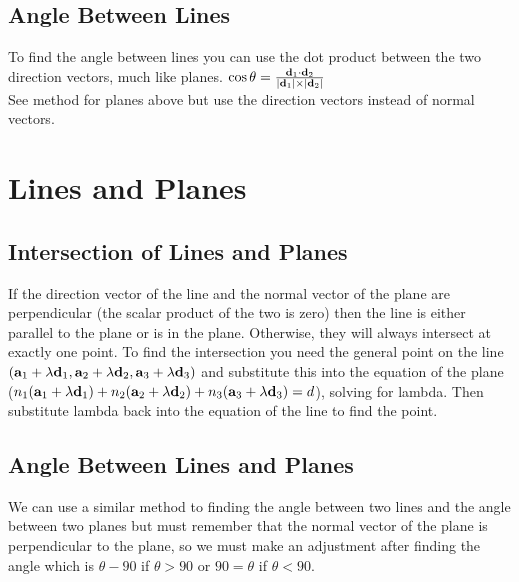 \documentclass[class=article, crop=false]{standalone}
\begin{document}
\subsection*{Angle Between Lines}
To find the angle between lines you can use the dot product between the two direction vectors, much like planes. $\cos \theta = \frac{\bold{d}_1 \cdot \bold{d}_2}{|\bold{d}_1| \times |\bold{d}_2|}$ \\

See method for planes above but use the direction vectors instead of normal vectors. 

\section*{Lines and Planes}
\subsection*{Intersection of Lines and Planes}
If the direction vector of the line and the normal vector of the plane are perpendicular (the scalar product of the two is zero) then the line is either parallel to the plane or is in the plane. Otherwise, they will always intersect at exactly one point. To find the intersection you need the general point on the line $(\bold{a}_1 + \lambda \bold{d}_1, \bold{a}_2 + \lambda \bold{d}_2, \bold{a}_3 + \lambda \bold{d}_3)$ and substitute this into the equation of the plane ($n_1(\bold{a}_1 + \lambda \bold{d}_1) + n_2(\bold{a}_2 + \lambda \bold{d}_2) + n_3(\bold{a}_3 + \lambda \bold{d}_3) = d$), solving for lambda. Then substitute lambda back into the equation of the line to find the point. 

\subsection*{Angle Between Lines and Planes}
We can use a similar method to finding the angle between two lines and the angle between two planes but must remember that the normal vector of the plane is perpendicular to the plane, so we must make an adjustment after finding the angle which is $\theta - 90$ if $\theta > 90$ or $90 = \theta$ if $\theta < 90$.
\end{document}
